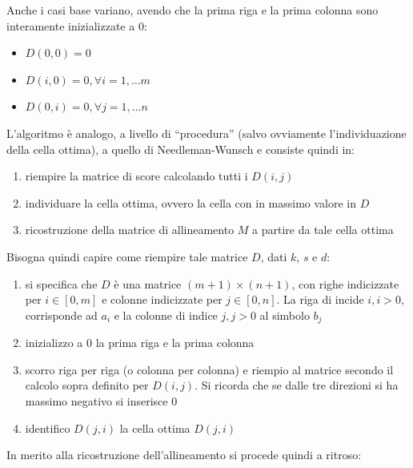 \documentclass[a4paper,12pt, oneside]{book}
\begin{document}
Anche i casi base variano, avendo che la prima riga e la prima colonna sono
interamente inizializzate a 0:
\begin{itemize}
  \item $D(0,0)=0$
  \item $D(i,0)=0, \forall i=1,\ldots m$
  \item $D(0,i)=0, \forall j=1,\ldots n$
\end{itemize}
L'algoritmo è analogo, a livello di ``procedura'' (salvo ovviamente
l'individuazione della cella ottima), a quello di Needleman-Wunsch
e consiste quindi in: 
\begin{enumerate}
  \item riempire la matrice di score calcolando tutti i $D(i,j)$
  \item individuare la cella ottima, ovvero la cella con in massimo valore in
  $D$  
  \item ricostruzione della matrice di allineamento $M$ a partire da tale cella
  ottima 
\end{enumerate}
Bisogna quindi capire come riempire tale matrice $D$, dati $k$, $s$ e $d$:
\begin{enumerate}
  \item si specifica che $D$ è una matrice $(m+1)\times(n+1)$, con righe
  indicizzate per $i\in[0,m]$ e colonne indicizzate per $j\in[0,n]$. La riga di
  incide $i,i>0$, corrisponde ad $a_i$ e la colonne di indice $j,j>0$ al simbolo
  $b_j$ 
  \item inizializzo a 0 la prima riga e la prima colonna
  \item scorro riga per riga (o colonna per colonna) e riempio al matrice
  secondo il calcolo sopra definito per $D(i,j)$. Si ricorda che se dalle tre
  direzioni si ha massimo negativo si inserisce 0
  \item identifico $D(j,i)$ la cella ottima $D(j,i)$
\end{enumerate}
In merito alla ricostruzione dell'allineamento si procede quindi a ritroso:
\end{document}
